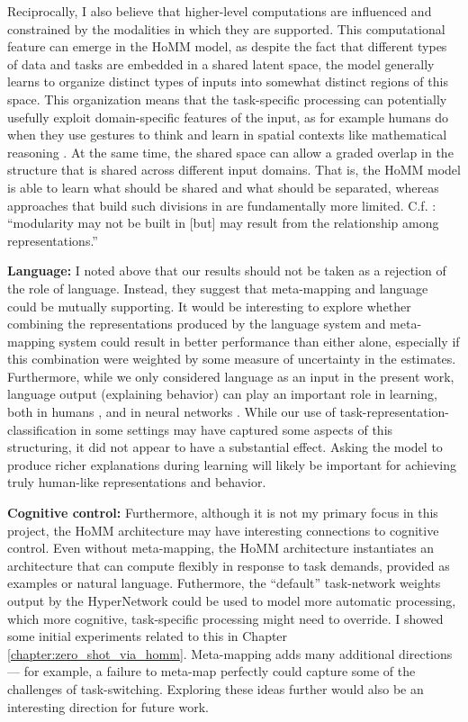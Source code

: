 Reciprocally, I also believe that higher-level computations are influenced and constrained by the modalities in which they are supported. This computational feature can emerge in the HoMM model, as despite the fact that different types of data and tasks are embedded in a shared latent space, the model generally learns to organize distinct types of inputs into somewhat distinct regions of this space. This organization means that the task-specific processing can potentially usefully exploit domain-specific features of the input, as for example humans do when they use gestures to think and learn in spatial contexts like mathematical reasoning \citep{Goldin-Meadow1999, Wakefield2018}. At the same time, the shared space can allow a graded overlap in the structure that is shared across different input domains. That is, the HoMM model is able to learn what should be shared and what should be separated, whereas approaches that build such divisions in are fundamentally more limited. C.f. \citet{Tanenhaus1987}: ``modularity may not be built in [but] may result from the relationship among representations.''\par

\textbf{Language:} I noted above that our results should not be taken as a rejection of the role of language. Instead, they suggest that meta-mapping and language could be mutually supporting. It would be interesting to explore whether combining the representations produced by the language system and meta-mapping system could result in better performance than either alone, especially if this combination were weighted by some measure of uncertainty in the estimates. Furthermore, while we only considered language as an input in the present work, language output (explaining behavior) can play an important role in learning, both in humans \citep{Chi1994}, and in neural networks \citep{Mu2019}. While our use of task-representation-classification in some settings may have captured some aspects of this structuring, it did not appear to have a substantial effect. Asking the model to produce richer explanations during learning will likely be important for achieving truly human-like representations and behavior. 

\textbf{Cognitive control:} Furthermore, although it is not my primary focus in this project, the HoMM architecture may have interesting connections to cognitive control. Even without meta-mapping, the HoMM architecture instantiates an architecture that can compute flexibly in response to task demands, provided as examples or natural language. Futhermore, the ``default'' task-network weights output by the HyperNetwork could be used to model more automatic processing, which more cognitive, task-specific processing might need to override. I showed some initial experiments related to this in Chapter \ref{chapter:zero_shot_via_homm}. Meta-mapping adds many additional directions --- for example, a failure to meta-map perfectly could capture some of the challenges of task-switching. Exploring these ideas further would also be an interesting direction for future work. \par

